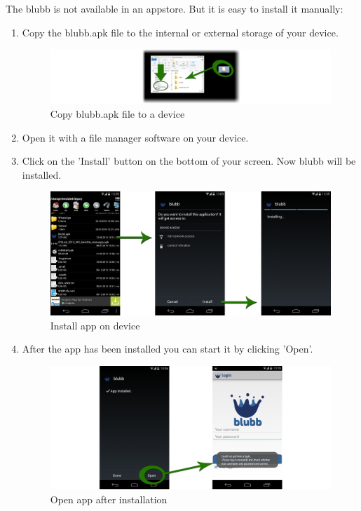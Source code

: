 \documentclass[12pt,a4paper,oneside]{report}
\newcommand{\appname}{blubb}
\begin{document}
The \appname{} is not available in an appstore. But it is easy to install it manually:
\begin{enumerate}
\item Copy the blubb.apk file to the internal or external storage of your device.
\begin{figure}[!ht]
    \includegraphics[width=\linewidth]{CopyApk.png}
    \caption{Copy blubb.apk file to a device}
\end{figure}
\item Open it with a file manager software on your device.
\item Click on the 'Install' button on the bottom of your screen. Now \appname{} will be installed.

\begin{figure}[!ht]
    \includegraphics[width=\linewidth]{InstallApp.png}
    \caption{Install app on device}
\end{figure}

\item After the app has been installed you can start it by clicking 'Open'.


\begin{figure}[!ht]
    \includegraphics[width=\linewidth]{AppInstalled.png}
    \caption{Open app after installation}
\end{figure}

\end{enumerate}
\end{document}
